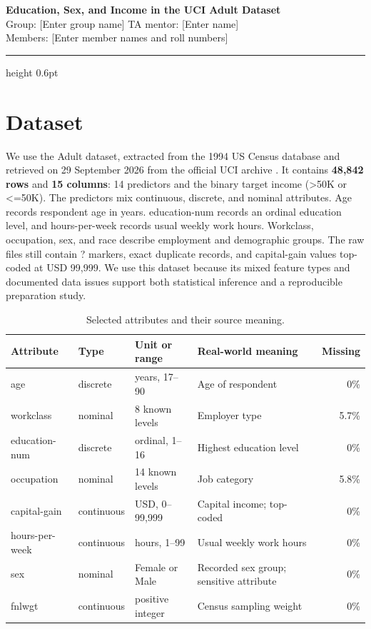 \documentclass[11pt,a4paper]{article}
\newcommand{\code}[1]{{\small\ttfamily #1}}
\newcommand{\stripe}{\rowcolors{2}{tint}{white}}
\begin{document}
\begin{center}
  {\sffamily\LARGE\bfseries Education, Sex, and Income in the UCI Adult Dataset}\\[5pt]
  {\sffamily\small Group: [Enter group name] \quad\textbar\quad TA mentor: [Enter name]}\\[2pt]
  {\sffamily\small Members: [Enter member names and roll numbers]}
\end{center}
\vspace{-4pt}
{\color{rule}\hrule height 0.6pt}
\vspace{6pt}

\section{Dataset}

We use the Adult dataset, extracted from the 1994 US Census database and
retrieved on 29 September 2026 from the official UCI archive
\cite{adult}. It contains \textbf{48,842 rows} and \textbf{15 columns}: 14
predictors and the binary target \code{income} (\code{>50K} or \code{<=50K}).
The predictors mix continuous, discrete, and nominal attributes. Age records
respondent age in years. \code{education-num} records an ordinal education
level, and \code{hours-per-week} records usual weekly work hours. Workclass,
occupation, sex, and race describe employment and demographic groups. The raw
files still contain \code{?} markers, exact duplicate records, and capital-gain
values top-coded at USD 99,999. We use this dataset because its mixed feature
types and documented data issues support both statistical inference and a
reproducible preparation study.

\begin{table}[H]
\centering\stripe
\caption{Selected attributes and their source meaning.}
\label{tab:selected-features}
\small
\begin{tabularx}{\textwidth}{@{}l l l X r@{}}
\toprule
\rowcolor{white}\textbf{Attribute} & \textbf{Type} & \textbf{Unit or range} & \textbf{Real-world meaning} & \textbf{Missing}\\
\midrule
\code{age} & discrete & years, 17--90 & Age of respondent & 0\%\\
\code{workclass} & nominal & 8 known levels & Employer type & 5.7\%\\
\code{education-num} & discrete & ordinal, 1--16 & Highest education level & 0\%\\
\code{occupation} & nominal & 14 known levels & Job category & 5.8\%\\
\code{capital-gain} & continuous & USD, 0--99,999 & Capital income; top-coded & 0\%\\
\code{hours-per-week} & continuous & hours, 1--99 & Usual weekly work hours & 0\%\\
\code{sex} & nominal & Female or Male & Recorded sex group; sensitive attribute & 0\%\\
\code{fnlwgt} & continuous & positive integer & Census sampling weight & 0\%\\
\bottomrule
\end{tabularx}
\end{table}
\end{document}
